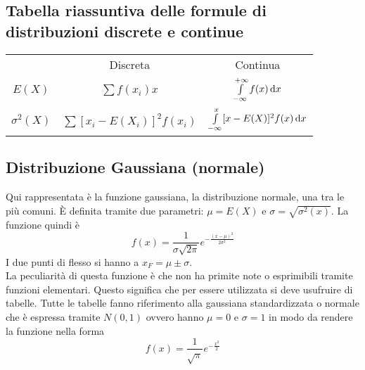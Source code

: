 \subsection{Tabella riassuntiva delle formule di distribuzioni discrete e continue}
\begin{center}
  \begin{tabular}{c|c|c}
    & Discreta & Continua\\
    $E(X)$ & $\sum f(x_i)x$ & $\int\limits_{-\infty}^{+\infty} f(x)\mathop{}\!\mathrm{d} x$\\
    $\sigma^2(X)$ & $\sum[x_i-E(X_i)]^2f(x_i)$ & $\int\limits_{-\infty}^{x} [x-E(X)]^2f(x)\mathop{}\!\mathrm{d} x$
  \end{tabular}
\end{center}

\subsection{Distribuzione Gaussiana (normale)}
\begin{center}
\end{center}
Qui rappresentata è la funzione gaussiana, la distribuzione normale, una tra le più comuni. È 
definita tramite due parametri: $\mu=E(X)$ e $\sigma=\sqrt{\sigma^2(x)}$. La funzione quindi è
\begin{equation*}
  f(x) = \frac{1}{\sigma\sqrt{2\pi}}e^{-\frac{(x-\mu)^2}{2\sigma^2}}
\end{equation*}
I due punti di flesso si hanno a $x_F = \mu\pm\sigma$.\\
La peculiarità di questa funzione è che non ha primite note o esprimibili tramite funzioni 
elementari. Questo significa che per essere utilizzata si deve usufruire di tabelle. Tutte le
tabelle fanno riferimento alla gaussiana standardizzata o normale che è espressa tramite $N(0,1)$
ovvero hanno $\mu=0$ e $\sigma=1$ in modo da rendere la funzione nella forma
\begin{equation*}
  f(x) = \frac{1}{\sqrt{\pi}} e^{-\frac{x^2}{2}}
\end{equation*}
